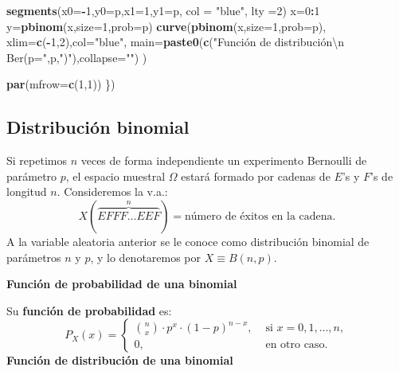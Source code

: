 \documentclass[]{book}
\newenvironment{Shaded}{\begin{snugshade}}{\end{snugshade}}
\newcommand{\DataTypeTok}[1]{\textcolor[rgb]{0.13,0.29,0.53}{#1}}
\newcommand{\DecValTok}[1]{\textcolor[rgb]{0.00,0.00,0.81}{#1}}
\newcommand{\KeywordTok}[1]{\textcolor[rgb]{0.13,0.29,0.53}{\textbf{#1}}}
\newcommand{\NormalTok}[1]{#1}
\newcommand{\OperatorTok}[1]{\textcolor[rgb]{0.81,0.36,0.00}{\textbf{#1}}}
\newcommand{\StringTok}[1]{\textcolor[rgb]{0.31,0.60,0.02}{#1}}
\begin{document}
\begin{Shaded}
\begin{Highlighting}[]
\KeywordTok{segments}\NormalTok{(}\DataTypeTok{x0=}\OperatorTok{-}\DecValTok{1}\NormalTok{,}\DataTypeTok{y0=}\NormalTok{p,}\DataTypeTok{x1=}\DecValTok{1}\NormalTok{,}\DataTypeTok{y1=}\NormalTok{p, }\DataTypeTok{col =} \StringTok{"blue"}\NormalTok{, }\DataTypeTok{lty =}\DecValTok{2}\NormalTok{)}
\NormalTok{x=}\DecValTok{0}\OperatorTok{:}\DecValTok{1}
\NormalTok{y=}\KeywordTok{pbinom}\NormalTok{(x,}\DataTypeTok{size=}\DecValTok{1}\NormalTok{,}\DataTypeTok{prob=}\NormalTok{p)}
\KeywordTok{curve}\NormalTok{(}\KeywordTok{pbinom}\NormalTok{(x,}\DataTypeTok{size=}\DecValTok{1}\NormalTok{,}\DataTypeTok{prob=}\NormalTok{p),}
      \DataTypeTok{xlim=}\KeywordTok{c}\NormalTok{(}\OperatorTok{-}\DecValTok{1}\NormalTok{,}\DecValTok{2}\NormalTok{),}\DataTypeTok{col=}\StringTok{"blue"}\NormalTok{,}
      \DataTypeTok{main=}\KeywordTok{paste0}\NormalTok{(}\KeywordTok{c}\NormalTok{(}\StringTok{"Función de distribución\textbackslash{}n Ber(p="}\NormalTok{,p,}\StringTok{")"}\NormalTok{),}\DataTypeTok{collapse=}\StringTok{""}\NormalTok{)}
\NormalTok{      )}

\KeywordTok{par}\NormalTok{(}\DataTypeTok{mfrow=}\KeywordTok{c}\NormalTok{(}\DecValTok{1}\NormalTok{,}\DecValTok{1}\NormalTok{))}
\NormalTok{\})}
\end{Highlighting}
\end{Shaded}

\hypertarget{distribuciuxf3n-binomial}{%
\subsection{Distribución binomial}\label{distribuciuxf3n-binomial}}

Si repetimos \(n\) veces de forma independiente un experimento Bernoulli de parámetro \(p\), el espacio muestral \(\Omega\) estará formado por cadenas de \(E\)'s y \(F\)'s de longitud \(n\).
Consideremos la v.a.:
\[X(\overbrace{EFFF\ldots EEF}^{n})=\mbox{número de éxitos en la cadena}.\]
A la variable aleatoria anterior se le conoce como distribución binomial de parámetros \(n\) y \(p\), y lo denotaremos por \(X\equiv B(n,p).\)

\textbf{Función de probabilidad de una binomial}

Su \textbf{función de probabilidad} es:
\[
P_{X}(x)=\left\{
\begin{array}{ll}
{n\choose x}\cdot  p^x \cdot(1-p)^{n-x}, &\mbox{ si } x=0,1,\ldots,n,\\
0,  & \mbox{ en otro caso.}
\end{array}\right.
\]
\textbf{Función de distribución de una binomial}
\end{document}
